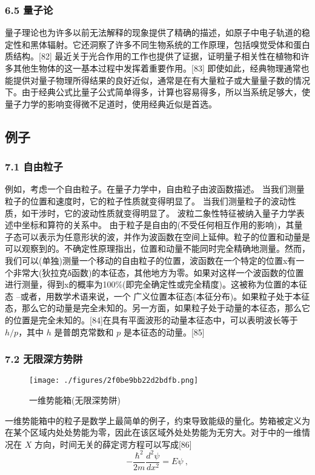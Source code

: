 \subsubsection{6.5 量子论}
量子理论也为许多以前无法解释的现象提供了精确的描述，如原子中电子轨道的稳定性和黑体辐射。它还洞察了许多不同生物系统的工作原理，包括嗅觉受体和蛋白质结构。[82] 最近关于光合作用的工作也提供了证据，证明量子相关性在植物和许多其他生物体的这一基本过程中发挥着重要作用。[83] 即使如此，经典物理通常也能提供对量子物理所得结果的良好近似，通常是在有大量粒子或大量量子数的情况下。由于经典公式比量子公式简单得多，计算也容易得多，所以当系统足够大，使量子力学的影响变得微不足道时，使用经典近似是首选。

\subsection{例子}
\subsubsection{7.1 自由粒子}
例如，考虑一个自由粒子。在量子力学中，自由粒子由波函数描述。 当我们测量粒子的位置和速度时，它的粒子性质就变得明显了。 当我们测量粒子的波动性质，如干涉时，它的波动性质就变得明显了。 波粒二象性特征被纳入量子力学表述中坐标和算符的关系中。 由于粒子是自由的(不受任何相互作用的影响)，其量子态可以表示为任意形状的波，并作为波函数在空间上延伸。粒子的位置和动量是可以观察到的。不确定性原理指出，位置和动量不能同时完全精确地测量。然而，我们可以(单独)测量一个移动的自由粒子的位置，波函数在一个特定的位置x有一个非常大(狄拉克δ函数)的本征态，其他地方为零。如果对这样一个波函数的位置进行测量，得到x的概率为100\%(即完全确定性或完全精度)。这被称为位置的本征态 –或者，用数学术语来说，一个 广义位置本征态(本征分布)。如果粒子处于本征态，那么它的动量是完全未知的。另一方面，如果粒子处于动量的本征态，那么它的位置是完全未知的。[84]在具有平面波形的动量本征态中，可以表明波长等于 $h/p$，其中 $h$ 是普朗克常数和 $p$ 是本征态的动量。[85]

\subsubsection{7.2 无限深方势阱}
\begin{figure}[ht]
\centering
\texttt{[image: ./figures/2f0be9bb22d2bdfb.png]}
\caption{一维势能箱(无限深势阱)} \label{fig_LZLX_6}
\end{figure}
一维势能箱中的粒子是数学上最简单的例子，约束导致能级的量化。势箱被定义为在某个区域内处处势能为零，因此在该区域外处处势能为无穷大。对于中的一维情况在 $X$ 方向，时间无关的薛定谔方程可以写成[86]
\begin{equation}
-\frac{\hbar^2}{2m} \frac{d^2 \psi}{dx^2} = E \psi~,
\end{equation}

